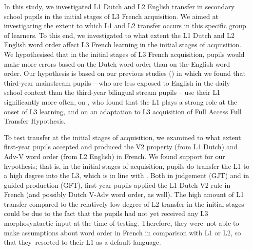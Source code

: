 \documentclass[output=paper]{langsci/langscibook}
\begin{document}
In this study, we investigated L1 Dutch and L2 English transfer in secondary school pupils in the initial stages of L3 French acquisition. We aimed at investigating the extent to which L1 and L2 transfer occurs in this specific group of learners. To this end, we investigated to what extent the L1 Dutch and L2 English word order affect L3 French learning in the initial stages of acquisition. We hypothesised that in the initial stages of L3 French acquisition, pupils would make more errors based on the Dutch word order than on the English word order. Our hypothesis is based on  our previous studies (\citealt{StadtEtAl2016, StadtEtAl2018Exposure}) in which we found that third-year mainstream pupils – who are less exposed to English in the daily school context than the third-year bilingual stream pupils – use their L1 significantly more often, on  \citet{Hermas2010, Hermas2014Morphosyntax, Hermas2014Relatives}, who found that the L1 plays a strong role at the onset of L3 learning, and  on an adaptation to L3 acquisition of  Full Access Full Transfer Hypothesis.

To test transfer at the initial stages of acquisition, we examined to what extent first-year pupils accepted and produced the V2 property (from L1 Dutch) and Adv-V word order (from L2 English) in French. We found support for our hypothesis; that is, in the initial stages of acquisition, pupils do transfer the L1 to a high degree into the L3, which is in line with \citet{Hermas2010, Hermas2014Morphosyntax, Hermas2014Relatives}. Both in judgement (GJT) and in guided production (GFT), first-year pupils applied the L1 Dutch V2 rule in French (and possibly Dutch V-Adv word order, as well). The high amount of L1 transfer compared to the relatively low degree of L2 transfer in the initial stages could be due to the fact that the pupils had not yet received any L3 morphosyntactic input at the time of testing. Therefore, they were~not able to make assumptions about word order in French in comparison with L1 or L2, so that they~resorted to their L1 as a default language.
\end{document}

